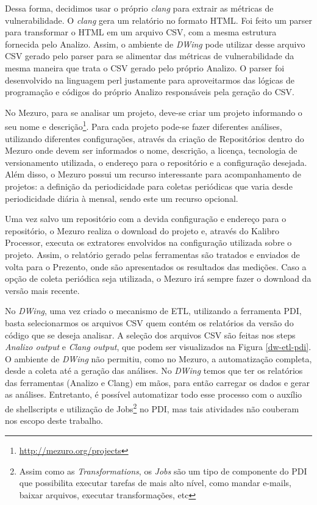 Dessa forma, decidimos usar o próprio  \emph{clang} para extrair as métricas de vulnerabilidade. O \emph{clang} gera um relatório no formato HTML. Foi feito um parser para transformar o HTML em um arquivo CSV, com a mesma estrutura fornecida pelo Analizo. Assim, o ambiente de \emph{DWing} pode utilizar desse arquivo CSV gerado pelo parser para se alimentar das métricas de vulnerabilidade da mesma maneira que trata o CSV gerado pelo próprio Analizo. O parser foi desenvolvido na linguagem perl justamente para aproveitarmos das lógicas de programação e códigos do próprio Analizo responsáveis pela geração do CSV.

No Mezuro, para se analisar um projeto, deve-se criar um projeto informando o seu nome e descrição\footnote{\url{http://mezuro.org/projects}}. Para cada projeto pode-se fazer diferentes análises, utilizando diferentes configurações, através da criação de Repositórios dentro do Mezuro onde devem ser informados o nome, descrição, a licença, tecnologia de versionamento utilizada, o endereço para o repositório e a configuração desejada. Além disso, o Mezuro possui um recurso interessante para acompanhamento de projetos: a definição da periodicidade para coletas periódicas que varia desde periodicidade diária à mensal, sendo este um recurso opcional.

Uma vez salvo um repositório com a devida configuração e endereço para o repositório, o Mezuro realiza o download do projeto e, através do Kalibro Processor, executa os extratores envolvidos na configuração utilizada sobre o projeto. Assim, o relatório gerado pelas ferramentas são tratados e enviados de volta para o Prezento, onde são apresentados os resultados das medições. Caso a opção de coleta periódica seja utilizada, o Mezuro irá sempre fazer o download da versão mais recente.


No \emph{DWing}, uma vez criado o mecanismo de ETL, utilizando a ferramenta PDI, basta selecionarmos os arquivos  CSV  quem contém os relatórios da versão do código que se deseja analisar. A seleção dos arquivos CSV são feitas nos steps \emph{Analizo output} e \emph{Clang output}, que podem ser visualizados na Figura \ref{dw-etl-pdi}. O ambiente de \emph{DWing} não permitiu, como no Mezuro, a automatização completa, desde a coleta até a geração das análises. No \emph{DWing} temos que ter os relatórios das ferramentas (Analizo e Clang) em mãos, para então carregar os dados e gerar as análises. Entretanto, é possível automatizar todo esse processo com o auxílio de shellscripts e utilização de Jobs\footnote{Assim como as \emph{Transformations}, os \emph{Jobs} são um tipo de componente do PDI que possibilita executar tarefas de mais alto nível, como mandar e-mails, baixar arquivos, executar transformações, etc} no PDI, mas tais atividades não couberam nos escopo deste trabalho.


